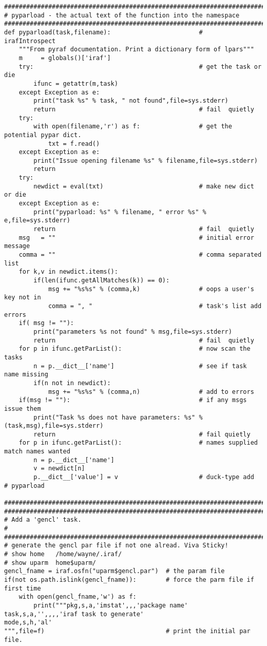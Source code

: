 {\begin{verbatim}
#############################################################################
# pyparload - the actual text of the function into the namespace
#############################################################################
def pyparload(task,filename):                        #   irafIntrospect
    """From pyraf documentation. Print a dictionary form of lpars"""
    m     = globals()['iraf']
    try:                                             # get the task or die
        ifunc = getattr(m,task)
    except Exception as e:
        print("task %s" % task, " not found",file=sys.stderr)
        return                                       # fail  quietly
    try:
        with open(filename,'r') as f:                # get the potential pypar dict.
            txt = f.read()
    except Exception as e:
        print("Issue opening filename %s" % filename,file=sys.stderr)
        return
    try:
        newdict = eval(txt)                          # make new dict or die
    except Exception as e:
        print("pyparload: %s" % filename, " error %s" % e,file=sys.stderr)
        return                                       # fail  quietly
    msg   = ""                                       # initial error message
    comma = ""                                       # comma separated list
    for k,v in newdict.items():
        if(len(ifunc.getAllMatches(k)) == 0):
            msg += "%s%s" % (comma,k)                # oops a user's key not in
            comma = ", "                             # task's list add errors
    if( msg != ""):
        print("parameters %s not found" % msg,file=sys.stderr)
        return                                       # fail  quietly
    for p in ifunc.getParList():                     # now scan the tasks
        n = p.__dict__['name']                       # see if task name missing
        if(n not in newdict):
            msg += "%s%s" % (comma,n)                # add to errors
    if(msg != ""):                                   # if any msgs issue them
        print("Task %s does not have parameters: %s" % (task,msg),file=sys.stderr)
        return                                       # fail quietly
    for p in ifunc.getParList():                     # names supplied match names wanted
        n = p.__dict__['name']
        v = newdict[n]
        p.__dict__['value'] = v                      # duck-type add
# pyparload

##############################################################################
##############################################################################
# Add a 'gencl' task.
#
##############################################################################
# generate the gencl par file if not one alread. Viva Sticky!
# show home   /home/wayne/.iraf/
# show uparm  home$uparm/
gencl_fname = iraf.osfn("uparm$gencl.par")  # the param file
if(not os.path.islink(gencl_fname)):        # force the parm file if first time
    with open(gencl_fname,'w') as f:
        print("""pkg,s,a,'imstat',,,'package name'
task,s,a,'',,,,'iraf task to generate'
mode,s,h,'al'
""",file=f)                                 # print the initial par file.


\end{verbatim}}

